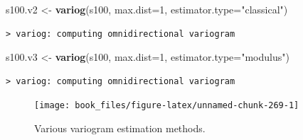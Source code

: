 \documentclass[b5paper,]{scrbook}
\makeatletter
\newenvironment{Shaded}{\begin{snugshade}}{\end{snugshade}}
\newcommand{\KeywordTok}[1]{\textcolor[rgb]{0.13,0.29,0.53}{\textbf{#1}}}
\newcommand{\DataTypeTok}[1]{\textcolor[rgb]{0.13,0.29,0.53}{#1}}
\newcommand{\DecValTok}[1]{\textcolor[rgb]{0.00,0.00,0.81}{#1}}
\newcommand{\StringTok}[1]{\textcolor[rgb]{0.31,0.60,0.02}{#1}}
\newcommand{\OperatorTok}[1]{\textcolor[rgb]{0.81,0.36,0.00}{\textbf{#1}}}
\newcommand{\NormalTok}[1]{#1}
\theoremstyle{plain}
\theoremstyle{definition}
\numberwithin{equation}{section}
\newenvironment{kframe}{%
\medskip{}
\setlength{\fboxsep}{.8em}
 \def\at@end@of@kframe{}%
 \ifinner\ifhmode%
  \def\at@end@of@kframe{\end{minipage}}%
  \begin{minipage}{\columnwidth}%
 \fi\fi%
 \def\FrameCommand##1{\hskip\@totalleftmargin \hskip-\fboxsep
 \colorbox{shadecolor}{##1}\hskip-\fboxsep
     \hskip-\linewidth \hskip-\@totalleftmargin \hskip\columnwidth}%
 \MakeFramed {\advance\hsize-\width
   \@totalleftmargin\z@ \linewidth\hsize
   \@setminipage}}%
 {\par\unskip\endMakeFramed%
 \at@end@of@kframe}
\renewenvironment{Shaded}{\begin{kframe}}{\end{kframe}}
\makeatother
\begin{document}
\begin{Shaded}
\begin{Highlighting}[]
\NormalTok{s100.v2 <-}\StringTok{ }\KeywordTok{variog}\NormalTok{(s100, }\DataTypeTok{max.dist=}\DecValTok{1}\NormalTok{, }\DataTypeTok{estimator.type=}\StringTok{"classical"}\NormalTok{)}
\end{Highlighting}
\end{Shaded}

\begin{verbatim}
> variog: computing omnidirectional variogram
\end{verbatim}

\begin{Shaded}
\begin{Highlighting}[]
\NormalTok{s100.v3 <-}\StringTok{ }\KeywordTok{variog}\NormalTok{(s100, }\DataTypeTok{max.dist=}\DecValTok{1}\NormalTok{, }\DataTypeTok{estimator.type=}\StringTok{"modulus"}\NormalTok{)}
\end{Highlighting}
\end{Shaded}

\begin{verbatim}
> variog: computing omnidirectional variogram
\end{verbatim}

\begin{Shaded}
\end{Shaded}

\begin{figure}

{\centering \texttt{[image: book\_files/figure-latex/unnamed-chunk-269-1]} 

}

\caption{Various variogram estimation methods.}\label{fig:unnamed-chunk-269}
\end{figure}
\end{document}
